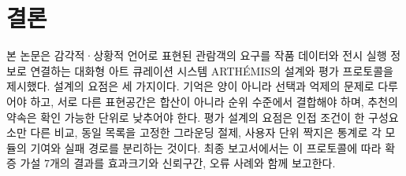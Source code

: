 \documentclass[10pt,twocolumn,letterpaper]{article}
\begin{document}
\section{결론}
본 논문은 감각적·상황적 언어로 표현된 관람객의 요구를 작품 데이터와 전시 실행 정보로 연결하는 대화형 아트 큐레이션 시스템 ARTHÉMIS의 설계와 평가 프로토콜을 제시했다. 설계의 요점은 세 가지이다. 기억은 양이 아니라 선택과 억제의 문제로 다루어야 하고, 서로 다른 표현공간은 합산이 아니라 순위 수준에서 결합해야 하며, 추천의 약속은 확인 가능한 단위로 낮추어야 한다. 평가 설계의 요점은 인접 조건이 한 구성요소만 다른 비교, 동일 목록을 고정한 그라운딩 절제, 사용자 단위 짝지은 통계로 각 모듈의 기여와 실패 경로를 분리하는 것이다. 최종 보고서에서는 이 프로토콜에 따라 확증 가설 7개의 결과를 효과크기와 신뢰구간, 오류 사례와 함께 보고한다.
\end{document}

